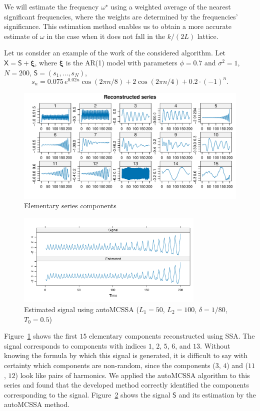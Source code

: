\documentclass[12pt]{article}
\begin{document}
We will estimate the frequency $\omega^\star$ using a weighted average of the nearest significant frequencies, where the weights are determined by the frequencies' significance.
This estimation method enables us to obtain a more accurate estimate of $\omega$ in the case when it does not fall in the $k/(2L)$ lattice.

Let us consider an example of the work of the considered algorithm. Let $\mathsf{X}=\mathsf{S}+\bm{\xi}$, where $\bm\xi$ is the AR(1) model with parameters $\phi=0.7$ and $\sigma^2=1$, $N=200$, $\mathsf{S}=(s_1,\ldots, s_N)$,
\[
s_n=0.075\, e^{0.02n}\cos(2\pi n/8) + 2\cos(2\pi n / 4) + 0.2\cdot(-1)^n.
\]

\begin{figure}[!h]
    \centering
    \includegraphics[width=\textwidth]{img/reconstructed_ts.pdf}
    \caption{Elementary series components}
    \label{fig:reconstructed_ts}
\end{figure}

\begin{figure}[!h]
    \centering
    \includegraphics[width=0.8\textwidth]{img/auto_mcssa_result.pdf}
    \caption{Estimated signal using autoMCSSA ($L_1=50$, $L_2=100$, $\delta=1/80$, $T_0=0.5$)}
    \label{fig:autoMCSSA_res}
\end{figure}

Figure~\ref{fig:reconstructed_ts} shows the first $15$ elementary components reconstructed using SSA. The signal corresponds to components with indices $1$, $2$, $5$, $6$, and $13$. Without knowing the formula by which this signal is generated, it is difficult to say with certainty which components are non-random, since the components ($3$, $4$) and ($11$, $12$) look like pairs of harmonics. We applied the autoMCSSA algorithm to this series and found that the developed method correctly identified the components corresponding to the signal. Figure~\ref{fig:autoMCSSA_res} shows the signal $\mathsf{S}$ and its estimation by the autoMCSSA method.
\end{document}

